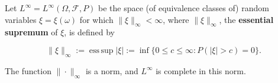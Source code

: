 Let $L^\infty = L^\infty(\Omega, \mathcal{F}, P)$ be the space (of equivalence classes of) random variables $\xi = \xi(\omega)$ for which $\|\xi\|_\infty < \infty$, where $\|\xi\|_\infty$, the \textbf{essential supremum} of $\xi$, is defined by

$$\|\xi\|_\infty := \operatorname{ess\,sup} |\xi| := \inf\{0 \leq c \leq \infty : P(|\xi| > c) = 0\}.$$

The function $\|\cdot\|_\infty$ is a norm, and $L^\infty$ is complete in this norm.
